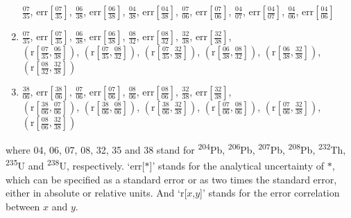 \begin{refsection}
\begin{enumerate}
  $\frac{07}{35}$,  
  $\mbox{err}\!\left[\frac{07}{35}\right]$, 
  $\frac{06}{38}$,  
  $\mbox{err}\!\left[\frac{06}{38}\right]$,  
  $\frac{04}{38}$,  
  $\mbox{err}\!\left[\frac{04}{38}\right]$,  
  $\frac{07}{06}$,  
  $\mbox{err}\!\left[\frac{07}{06}\right]$, 
  $\frac{04}{07}$,  
  $\mbox{err}\!\left[\frac{04}{07}\right]$,  
  $\frac{04}{06}$,  
  $\mbox{err}\!\left[\frac{04}{06}\right]$
  \item 
  $\frac{07}{35}$,  
  $\mbox{err}\!\left[\frac{07}{35}\right]$, 
  $\frac{06}{38}$,  
  $\mbox{err}\!\left[\frac{06}{38}\right]$,  
  $\frac{08}{32}$,  
  $\mbox{err}\!\left[\frac{08}{32}\right]$,  
  $\frac{32}{38}$,  
  $\mbox{err}\!\left[\frac{32}{38}\right]$,  \\
  $\left(\mbox{r}\!\left[\frac{07}{35},\frac{06}{38}\right]\right)$,  
  $\left(\mbox{r}\!\left[\frac{07}{35},\frac{08}{32}\right]\right)$, 
  $\left(\mbox{r}\!\left[\frac{07}{35},\frac{32}{38}\right]\right)$,  
  $\left(\mbox{r}\!\left[\frac{06}{38},\frac{08}{32}\right]\right)$,  
  $\left(\mbox{r}\!\left[\frac{06}{38},\frac{32}{38}\right]\right)$, 
  $\left(\mbox{r}\!\left[\frac{08}{32},\frac{32}{38}\right]\right)$
  \item
  $\frac{38}{06}$,  
  $\mbox{err}\!\left[\frac{38}{06}\right]$, 
  $\frac{07}{06}$,  
  $\mbox{err}\!\left[\frac{07}{06}\right]$,  
  $\frac{08}{06}$,  
  $\mbox{err}\!\left[\frac{08}{06}\right]$,  
  $\frac{32}{38}$,  
  $\mbox{err}\!\left[\frac{32}{38}\right]$,  \\
  $\left(\mbox{r}\!\left[\frac{38}{06},\frac{07}{06}\right]\right)$,  
  $\left(\mbox{r}\!\left[\frac{38}{06},\frac{08}{06}\right]\right)$, 
  $\left(\mbox{r}\!\left[\frac{38}{06},\frac{32}{38}\right]\right)$,  
  $\left(\mbox{r}\!\left[\frac{07}{06},\frac{08}{06}\right]\right)$,  
  $\left(\mbox{r}\!\left[\frac{07}{06},\frac{32}{38}\right]\right)$, 
  $\left(\mbox{r}\!\left[\frac{08}{06},\frac{32}{38}\right]\right)$
\end{enumerate}

\noindent where 04, 06, 07, 08, 32, 35 and 38 stand for
\textsuperscript{204}Pb, \textsuperscript{206}Pb,
\textsuperscript{207}Pb, \textsuperscript{208}Pb,
\textsuperscript{232}Th, \textsuperscript{235}U and
\textsuperscript{238}U, respectively. `err[$\ast$]' stands for the
analytical uncertainty of $\ast$, which can be specified as a standard
error or as two times the standard error, either in absolute or
relative units. And `r[$x$,$y$]' stands for the error correlation
between $x$ and $y$.\\


\end{refsection}
